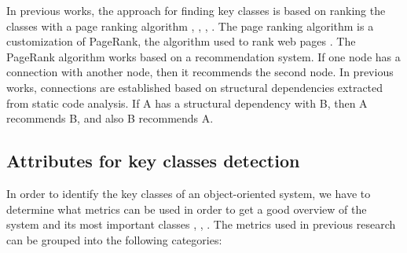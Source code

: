 \documentclass[12pt]{mitthesis}
\begin{document}
In previous works, the approach for finding key classes is based on ranking the classes with a page ranking algorithm \cite{PagerankENASE}, \cite{enase15}, \cite{Finding-key-classes}, \cite{PagerankSACI} . The page ranking algorithm is a customization of PageRank, the algorithm used to rank web pages \cite{ilprints422}. 
The PageRank algorithm works based on a recommendation system. If one node has a connection with another node, then it recommends the second node. In previous works, connections are established based on structural dependencies extracted from static code analysis. If A has a structural dependency with B, then A recommends B, and also B recommends A. 

\subsection{Attributes for key classes detection}
In order to identify the key classes of an object-oriented system, we have to determine what metrics can be used in order to get a good overview of the system and its most important classes \cite{Ding2016AnIA}, \cite{ZaidmanJurnal}, \cite{PAN2018188} . 
The metrics used in previous research can be grouped into the following categories: 
\end{document}
